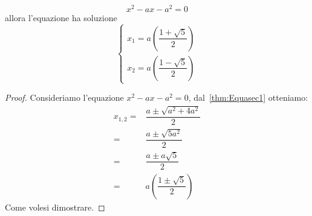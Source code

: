 \begin{thm}[Phi]\label{thm:Equasec3Phi}
	\[x^2-ax-a^2=0 \] allora l'equazione ha soluzione \[\begin{cases}
		x_1=a\left(\dfrac{1+\sqrt{5}}{2}\right) \\ 
		x_2=a\left(\dfrac{1-\sqrt{5}}{2}\right) 
	\end{cases}\]
\end{thm}
\begin{proof}
Consideriamo l'equazione $x^2-ax-a^2=0$, dal~\cref{thm:Equasec1} otteniamo:
\begin{align*}
	x_{1,2}=&\dfrac{a\pm\sqrt{a^2+4a^2}}{2}\\
	=&\dfrac{a\pm\sqrt{5a^2}}{2}\\
	=&\dfrac{a\pm a\sqrt{5}}{2}\\
	=&a\left(\dfrac{1\pm\sqrt{5}}{2}\right)
\end{align*}
Come volesi dimostrare.
\end{proof}